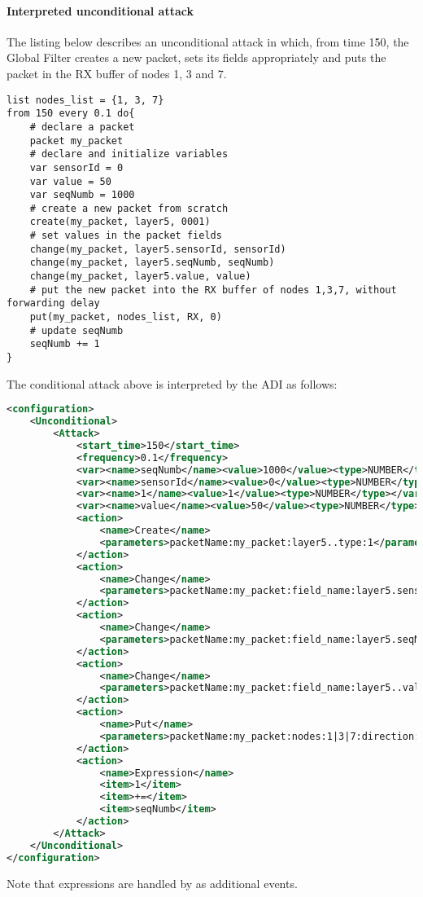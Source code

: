 \paragraph{Interpreted unconditional attack}
The listing below describes an unconditional attack in which, from time 150, the Global Filter creates a new packet, sets its fields appropriately and puts the packet in the RX buffer of nodes 1, 3 and 7.
%
\begin{lstlisting}[language={adl}]
list nodes_list = {1, 3, 7}
from 150 every 0.1 do{
    # declare a packet
    packet my_packet
    # declare and initialize variables
    var sensorId = 0
    var value = 50
    var seqNumb = 1000
    # create a new packet from scratch
    create(my_packet, layer5, 0001)
    # set values in the packet fields 
    change(my_packet, layer5.sensorId, sensorId)
    change(my_packet, layer5.seqNumb, seqNumb)
    change(my_packet, layer5.value, value)
    # put the new packet into the RX buffer of nodes 1,3,7, without forwarding delay
    put(my_packet, nodes_list, RX, 0)
    # update seqNumb
    seqNumb += 1
}
\end{lstlisting}
%
The conditional attack above is interpreted by the ADI as follows:
%
\begin{lstlisting}[language={xml}]
<configuration>
    <Unconditional>
        <Attack>
            <start_time>150</start_time>
            <frequency>0.1</frequency>
            <var><name>seqNumb</name><value>1000</value><type>NUMBER</type></var>
            <var><name>sensorId</name><value>0</value><type>NUMBER</type></var>
            <var><name>1</name><value>1</value><type>NUMBER</type></var>
            <var><name>value</name><value>50</value><type>NUMBER</type></var>
            <action>
                <name>Create</name>
                <parameters>packetName:my_packet:layer5..type:1</parameters>
            </action>
            <action>
                <name>Change</name>
                <parameters>packetName:my_packet:field_name:layer5.sensorId:value:sensorId</parameters>
            </action>
            <action>
                <name>Change</name>
                <parameters>packetName:my_packet:field_name:layer5.seqNumb:value:seqNumb</parameters>
            </action>
            <action>
                <name>Change</name>
                <parameters>packetName:my_packet:field_name:layer5..value:value:value</parameters>
            </action>
            <action>
                <name>Put</name>
                <parameters>packetName:my_packet:nodes:1|3|7:direction:RX:false:delay:0</parameters>
            </action>
            <action>
                <name>Expression</name>
                <item>1</item>
                <item>+=</item>
                <item>seqNumb</item>
            </action>
        </Attack>
    </Unconditional>
</configuration>
\end{lstlisting}

Note that expressions are handled by \asf as additional events.